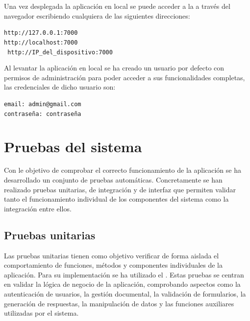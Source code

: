 Una vez desplegada la aplicación en local se puede acceder a la  a través del navegador  escribiendo cualquiera de las siguientes direcciones:

\begin{tcolorbox}[
	colback=cyan!5,
	colframe=cyan!50!black,
	title=navegador web,
	fonttitle=\bfseries,
	breakable
]
	{\footnotesize
		\noindent
		\texttt{http://127.0.0.1:7000}\\
		\texttt{http://localhost:7000}\\
		\texttt{	http://IP\_del\_dispositivo:7000}
	}
\end{tcolorbox}

Al levantar la aplicación en local se ha creado un usuario por defecto con permisos de administración para poder acceder a sus funcionalidades completas, las credenciales de dicho usuario son: 

\begin{tcolorbox}[
	colback=yellow!8,
	colframe=orange!60!black,
	title=Credenciales por defecto,
	fonttitle=\bfseries,
	breakable
]
	{\footnotesize
		\noindent
		\texttt{email: admin@gmail.com}\\
		\texttt{contraseña: contraseña}
	}
\end{tcolorbox}

\section{Pruebas del sistema}
\label{prog:prueb}

Con le objetivo de comprobar el correcto funcionamiento de la aplicación  se ha desarrollado un conjunto de pruebas automáticas. Concretamente se han realizado pruebas unitarias, de integración y de interfaz que permiten validar tanto el funcionamiento individual de los componentes del sistema como la integración entre ellos.

\subsection{Pruebas unitarias}

Las pruebas unitarias tienen como objetivo verificar de forma aislada el comportamiento de funciones, métodos y componentes individuales de la aplicación. Para su implementación se ha utilizado el  . Estas pruebas se centran en validar la lógica de negocio de la aplicación, comprobando aspectos como la autenticación de usuarios, la gestión documental, la validación de formularios, la generación de respuestas, la manipulación de datos y las funciones auxiliares utilizadas por el sistema.

